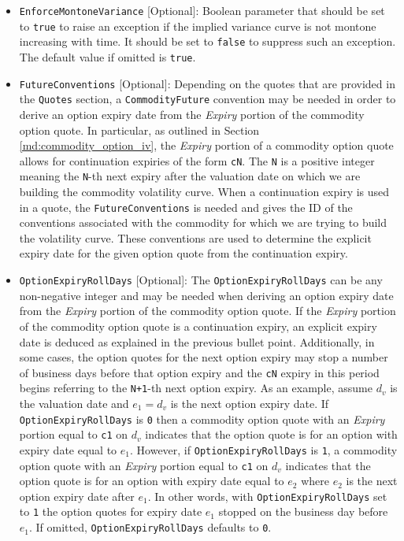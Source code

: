 \begin{itemize}
\item \lstinline!EnforceMontoneVariance! [Optional]: Boolean parameter that should be set to \lstinline!true! to raise an exception if the implied variance curve is not montone increasing with time. It should be set to \lstinline!false! to suppress such an exception. The default value if omitted is \lstinline!true!.
\item \lstinline!FutureConventions! [Optional]: Depending on the quotes that are provided in the \lstinline!Quotes! section, a \lstinline!CommodityFuture! convention may be needed in order to derive an option expiry date from the \textit{Expiry} portion of the commodity option quote. In particular, as outlined in Section \ref{md:commodity_option_iv}, the \textit{Expiry} portion of a commodity option quote allows for continuation expiries of the form \lstinline!cN!. The \lstinline!N! is a positive integer meaning the \lstinline!N!-th next expiry after the valuation date on which we are building the commodity volatility curve. When a continuation expiry is used in a quote, the \lstinline!FutureConventions! is needed and gives the ID of the conventions associated with the commodity for which we are trying to build the volatility curve. These conventions are used to determine the explicit expiry date for the given option quote from the continuation expiry.
\item \lstinline!OptionExpiryRollDays! [Optional]: The \lstinline!OptionExpiryRollDays! can be any non-negative integer and may be needed when deriving an option expiry date from the \textit{Expiry} portion of the commodity option quote. If the \textit{Expiry} portion of the commodity option quote is a continuation expiry, an explicit expiry date is deduced as explained in the previous bullet point. Additionally, in some cases, the option quotes for the next option expiry may stop a number of business days before that option expiry and the \lstinline!cN! expiry in this period begins referring to the \lstinline!N+1!-th next option expiry. As an example, assume $d_v$ is the valuation date and $e_1 = d_v$ is the next option expiry date. If \lstinline!OptionExpiryRollDays! is \lstinline!0! then a commodity option quote with an \textit{Expiry} portion equal to \lstinline!c1! on $d_v$ indicates that the option quote is for an option with expiry date equal to $e_1$. However, if \lstinline!OptionExpiryRollDays! is \lstinline!1!, a commodity option quote with an \textit{Expiry} portion equal to \lstinline!c1! on $d_v$ indicates that the option quote is for an option with expiry date equal to $e_2$ where $e_2$ is the next option expiry date after $e_1$. In other words, with \lstinline!OptionExpiryRollDays! set to \lstinline!1! the option quotes for expiry date $e_1$ stopped on the business day before $e_1$. If omitted, \lstinline!OptionExpiryRollDays! defaults to \lstinline!0!.
\end{itemize}

